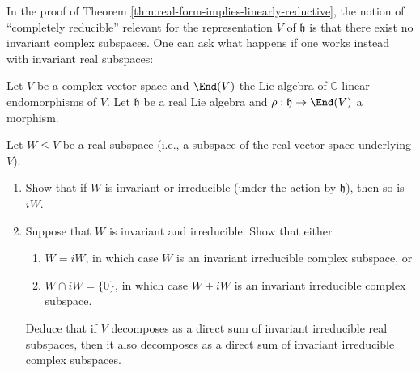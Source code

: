 \documentclass[reqno]{amsart} 
\begin{document}
In the proof of Theorem
\ref{thm:real-form-implies-linearly-reductive}, the notion of
``completely reducible'' relevant for the representation $V$ of
$\mathfrak{h}$
is that there exist no invariant complex subspaces.
One can ask what happens if one works instead with invariant
real subspaces:
\begin{exercise}
  Let $V$ be a complex vector space
  and $\End(V)$
  the Lie algebra of $\mathbb{C}$-linear endomorphisms of $V$.
  Let $\mathfrak{h}$ be a real Lie algebra
  and $\rho : \mathfrak{h} \rightarrow \End(V)$
  a morphism.

  Let $W \leq V$ be a real subspace (i.e., a subspace
  of the real vector space underlying $V$).
  \begin{enumerate}
  \item   Show that if $W$ is invariant or irreducible
    (under the action by $\mathfrak{h}$),
  then so is $i W$.
\item
  Suppose that $W$ is invariant and irreducible.
  Show that either
  \begin{enumerate}
  \item  $W = i W$,
    in which case $W$ is an invariant irreducible complex subspace, or
  \item
    $W \cap i W = \{0\}$,
    in which case $W + i W$ is an invariant irreducible complex subspace.
  \end{enumerate}
  Deduce that if $V$ decomposes
  as a direct sum of invariant irreducible
  real subspaces,
  then it also decomposes
  as a direct sum of invariant irreducible
  complex subspaces.
  \end{enumerate}
\end{exercise}
\end{document}
